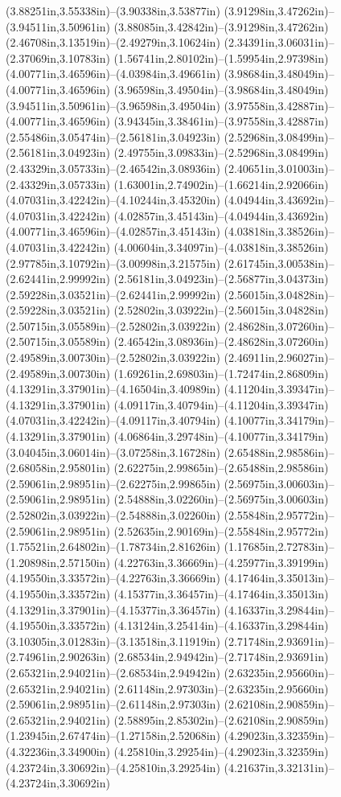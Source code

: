 (3.88251in,3.55338in)--(3.90338in,3.53877in) (3.91298in,3.47262in)--(3.94511in,3.50961in) (3.88085in,3.42842in)--(3.91298in,3.47262in) (2.46708in,3.13519in)--(2.49279in,3.10624in) (2.34391in,3.06031in)--(2.37069in,3.10783in) (1.56741in,2.80102in)--(1.59954in,2.97398in) (4.00771in,3.46596in)--(4.03984in,3.49661in) (3.98684in,3.48049in)--(4.00771in,3.46596in) (3.96598in,3.49504in)--(3.98684in,3.48049in) (3.94511in,3.50961in)--(3.96598in,3.49504in) (3.97558in,3.42887in)--(4.00771in,3.46596in) (3.94345in,3.38461in)--(3.97558in,3.42887in) (2.55486in,3.05474in)--(2.56181in,3.04923in) (2.52968in,3.08499in)--(2.56181in,3.04923in) (2.49755in,3.09833in)--(2.52968in,3.08499in) (2.43329in,3.05733in)--(2.46542in,3.08936in) (2.40651in,3.01003in)--(2.43329in,3.05733in) (1.63001in,2.74902in)--(1.66214in,2.92066in) (4.07031in,3.42242in)--(4.10244in,3.45320in) (4.04944in,3.43692in)--(4.07031in,3.42242in) (4.02857in,3.45143in)--(4.04944in,3.43692in) (4.00771in,3.46596in)--(4.02857in,3.45143in) (4.03818in,3.38526in)--(4.07031in,3.42242in) (4.00604in,3.34097in)--(4.03818in,3.38526in) (2.97785in,3.10792in)--(3.00998in,3.21575in) (2.61745in,3.00538in)--(2.62441in,2.99992in) (2.56181in,3.04923in)--(2.56877in,3.04373in) (2.59228in,3.03521in)--(2.62441in,2.99992in) (2.56015in,3.04828in)--(2.59228in,3.03521in) (2.52802in,3.03922in)--(2.56015in,3.04828in) (2.50715in,3.05589in)--(2.52802in,3.03922in) (2.48628in,3.07260in)--(2.50715in,3.05589in) (2.46542in,3.08936in)--(2.48628in,3.07260in) (2.49589in,3.00730in)--(2.52802in,3.03922in) (2.46911in,2.96027in)--(2.49589in,3.00730in) (1.69261in,2.69803in)--(1.72474in,2.86809in) (4.13291in,3.37901in)--(4.16504in,3.40989in) (4.11204in,3.39347in)--(4.13291in,3.37901in) (4.09117in,3.40794in)--(4.11204in,3.39347in) (4.07031in,3.42242in)--(4.09117in,3.40794in) (4.10077in,3.34179in)--(4.13291in,3.37901in) (4.06864in,3.29748in)--(4.10077in,3.34179in) (3.04045in,3.06014in)--(3.07258in,3.16728in) (2.65488in,2.98586in)--(2.68058in,2.95801in) (2.62275in,2.99865in)--(2.65488in,2.98586in) (2.59061in,2.98951in)--(2.62275in,2.99865in) (2.56975in,3.00603in)--(2.59061in,2.98951in) (2.54888in,3.02260in)--(2.56975in,3.00603in) (2.52802in,3.03922in)--(2.54888in,3.02260in) (2.55848in,2.95772in)--(2.59061in,2.98951in) (2.52635in,2.90169in)--(2.55848in,2.95772in) (1.75521in,2.64802in)--(1.78734in,2.81626in) (1.17685in,2.72783in)--(1.20898in,2.57150in) (4.22763in,3.36669in)--(4.25977in,3.39199in) (4.19550in,3.33572in)--(4.22763in,3.36669in) (4.17464in,3.35013in)--(4.19550in,3.33572in) (4.15377in,3.36457in)--(4.17464in,3.35013in) (4.13291in,3.37901in)--(4.15377in,3.36457in) (4.16337in,3.29844in)--(4.19550in,3.33572in) (4.13124in,3.25414in)--(4.16337in,3.29844in) (3.10305in,3.01283in)--(3.13518in,3.11919in) (2.71748in,2.93691in)--(2.74961in,2.90263in) (2.68534in,2.94942in)--(2.71748in,2.93691in) (2.65321in,2.94021in)--(2.68534in,2.94942in) (2.63235in,2.95660in)--(2.65321in,2.94021in) (2.61148in,2.97303in)--(2.63235in,2.95660in) (2.59061in,2.98951in)--(2.61148in,2.97303in) (2.62108in,2.90859in)--(2.65321in,2.94021in) (2.58895in,2.85302in)--(2.62108in,2.90859in) (1.23945in,2.67474in)--(1.27158in,2.52068in) (4.29023in,3.32359in)--(4.32236in,3.34900in) (4.25810in,3.29254in)--(4.29023in,3.32359in) (4.23724in,3.30692in)--(4.25810in,3.29254in) (4.21637in,3.32131in)--(4.23724in,3.30692in) 